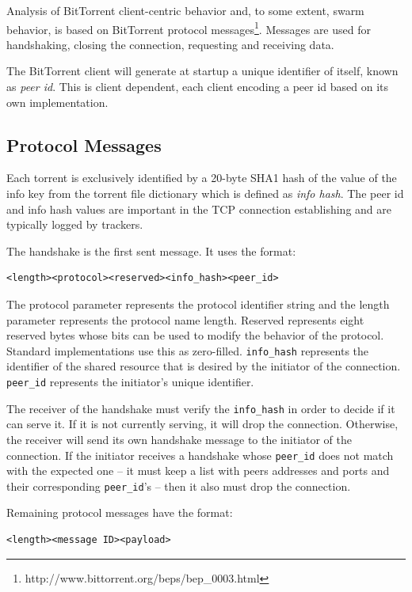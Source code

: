 Analysis of BitTorrent client-centric behavior and, to some extent, swarm
behavior, is based on BitTorrent protocol
messages\footnote{http://www.bittorrent.org/beps/bep\_0003.html}. Messages are
used for handshaking, closing the connection, requesting and receiving data.

The BitTorrent client will generate at startup a unique identifier of itself,
known as \textit{peer id}. This is client dependent, each client encoding a
peer id based on its own implementation.

\subsection{Protocol Messages}

Each torrent is exclusively identified by a 20-byte SHA1 hash of the value of
the info key from the torrent file dictionary which is defined as \textit{info
hash}. The peer id and info hash values are important in the TCP connection
establishing and are typically logged by trackers.

The handshake is the first sent message. It uses the format:
\begin{verbatim}
<length><protocol><reserved><info_hash><peer_id>
\end{verbatim}

The protocol parameter represents the protocol identifier string and the
length parameter represents the protocol name length. Reserved represents
eight reserved bytes whose bits can be used to modify the behavior of the
protocol. Standard implementations use this as zero-filled.
\texttt{info\_hash} represents the identifier of the shared resource that is
desired by the initiator of the connection. \texttt{peer\_id} represents the
initiator's unique identifier.

The receiver of the handshake must verify the \texttt{info\_hash} in order to
decide if it can serve it. If it is not currently serving, it will drop the
connection.  Otherwise, the receiver will send its own handshake message to
the initiator of the connection. If the initiator receives a handshake whose
\texttt{peer\_id} does not match with the expected one -- it must keep a list
with peers addresses and ports and their corresponding \texttt{peer\_id}'s --
then it also must drop the connection.

Remaining protocol messages have the format:
\begin{verbatim}
<length><message ID><payload>
\end{verbatim}

